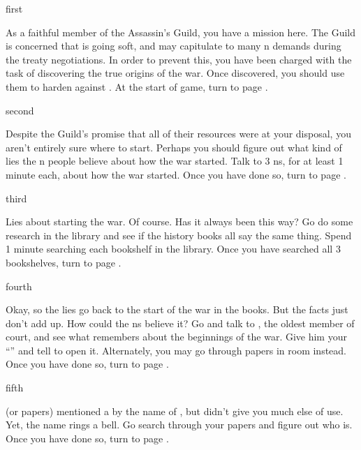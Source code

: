\documentclass[greennotebook]{NeptuneBall}
\begin{document}
\startnotebook{\nWar{}}

\begin{page}{first}

As a faithful member of the Assassin's Guild, you have a mission here. The Guild is concerned that \cPrince{} is going soft, and may capitulate to many \pAtlantis{}n demands during the treaty negotiations. In order to prevent this, you have been charged with the task of discovering the true origins of the war. Once discovered, you should use them to harden \cPrince{} against \pAtlantis{}. At the start of game, turn to page .

\end{page}

\begin{page}{second}

Despite the Guild's promise that all of their resources were at your disposal, you aren't entirely sure where to start. Perhaps you should figure out what kind of lies the \pAtlantis{}n people believe about how the war started. Talk to 3 \pAtlantis{}ns, for at least 1 minute each, about how the war started. Once you have done so, turn to page .

\end{page}

\begin{page}{third}

Lies about \pPacifica{} starting the war. Of course. Has it always been this way? Go do some research in the library and see if the history books all say the same thing. Spend 1 minute searching each bookshelf in the library. Once you have searched all 3 bookshelves, turn to page .

\end{page}

\begin{page}{fourth}

Okay, so the lies go back to the start of the war in the books. But the facts just don't add up. How could the \pAtlantis{}ns believe it? Go and talk to \cManta{}, the oldest member of court, and see what \cManta{\they} remembers about the beginnings of the war. Give him your ``\mWPacket{\MYname}'' and tell \cManta{\them} to open it. Alternately, you may go through \cManta{\their} papers in \cManta{\their} room instead. Once you have done so, turn to page .

\end{page}

\begin{page}{fifth}

\cManta{} (or \cManta{\their} papers) mentioned a \cMother{\mer} by the name of \cMother{}, but didn't give you much else of use. Yet, the name rings a bell. Go search through your papers and figure out who \cMother{\they} is. Once you have done so, turn to page .

\end{page}
\end{document}
